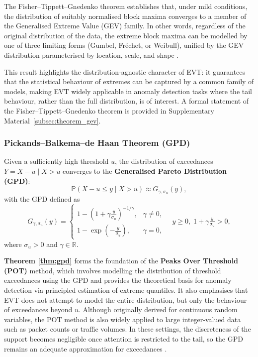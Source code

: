\documentclass{statsmsc}
\begin{document}
The Fisher–Tippett–Gnedenko theorem establishes that, under mild conditions, 
the distribution of suitably normalised block maxima converges to a member of the 
Generalised Extreme Value (GEV) family. In other words, regardless of the 
original distribution of the data, the extreme block maxima can be modelled by one of 
three limiting forms (Gumbel, Fréchet, or Weibull), unified by the GEV distribution 
parameterised by location, scale, and shape \citep{gnedenko1943distribution}. 

This result highlights the distribution-agnostic character of EVT: 
it guarantees that the statistical behaviour of extremes can be captured by a common 
family of models, making EVT widely applicable in anomaly detection tasks where 
the tail behaviour, rather than the full distribution, is of interest.
A formal statement of the Fisher–Tippett–Gnedenko theorem is provided in Supplementary 
Material~\ref{subsec:theorem_gev}.

\subsubsection{Pickands–Balkema–de Haan Theorem (GPD)}\label{subsec:gpd}

\begin{theorem} \label{thm:gpd}
Given a sufficiently high threshold \( u \), the distribution of exceedances 
\( Y = X - u \mid X > u \) converges to the 
\textbf{Generalised Pareto Distribution (GPD)}:
\begin{equation}
\mathbb{P}(X - u \le y \mid X > u) \approx G_{\gamma, \sigma_u}(y),
\label{eqn:gpd}
\end{equation}
with the GPD defined as
\begin{equation}
G_{\gamma, \sigma_u}(y) = 
\begin{cases}
1 - \left(1 + \gamma \tfrac{y}{\sigma_u} \right)^{-1/\gamma}, & \gamma \ne 0, \\
1 - \exp\!\left(-\tfrac{y}{\sigma_u}\right), & \gamma = 0,
\end{cases}
\quad y \ge 0, \; 1 + \gamma \tfrac{y}{\sigma_u} > 0,
\label{eqn:gpd-def}
\end{equation}
where \( \sigma_u > 0 \) and \( \gamma \in \mathbb{R} \).
\end{theorem}

\textbf{Theorem \ref{thm:gpd}} forms the foundation of the \textbf{Peaks Over Threshold (POT)} 
method, which involves modelling the distribution of threshold exceedances using the GPD 
\citep{balkema1974residual, pickands1975statistical, leadbetter1983extremes} and provides the theoretical basis for 
anomaly detection via principled estimation of extreme quantiles. 
It also emphasises that EVT does not attempt to model the entire distribution, but only the behaviour of 
exceedances beyond \( u \). Although originally derived for continuous random variables, the POT method is also widely 
applied to large integer-valued data such as packet counts or traffic volumes. In these settings, the discreteness of
the support becomes negligible once attention is restricted to the tail, so the GPD remains an adequate approximation 
for exceedances \citep{Coles2001, embrechts1997modelling}.
\end{document}
